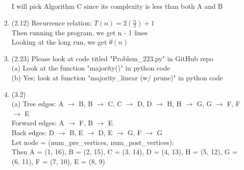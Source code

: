 \documentclass{article}
\begin{document}
\begin{enumerate}
			I will pick Algorithm C since its complexity is less than both A and B
			\\
			
		\item
			(2.12) Recurrence relation: $T(n) = 2(\frac{n}{2}) + 1$ \\
			Then running the program, we get n - 1 lines \\
			Looking at the long run, we get $\theta(n)$
			\\
			
		\item
			(2.23) Please look at code titled "Problem\_223.py" in GitHub repo \\
			(a) Look at the function "majority()" in python code\\
			(b) Yes; look at function "majority\_linear (w/ prune)" in python code
			\\
			
		\item
			(3.2) 
			\\
			(a) Tree edges:
			A $\rightarrow$ B, B $\rightarrow$ C, C $\rightarrow$ D, D $\rightarrow$ H, H $\rightarrow$ G, G $\rightarrow$ F, F $\rightarrow$ E \\
			Forward edges:  A $\rightarrow$ F, B $\rightarrow$ E\\
			Back edges:  D $\rightarrow$ B, E $\rightarrow$ D, E $\rightarrow$ G, F $\rightarrow$ G\\
			Let node = (num\_pre\_vertices, num\_post\_vertices): \\
			Then A = (1, 16), B = (2, 15), C = (3, 14), D = (4, 13), H = (5, 12), G = (6, 11), F = (7, 10), E = (8, 9)
			\\
		

\end{enumerate}
\end{document}
